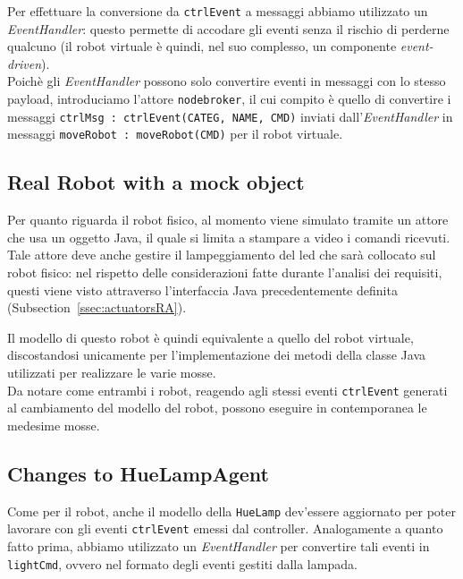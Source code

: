 \documentclass{../llncs}
\newcommand{\codescript}[1]{{\mbox{\small{\texttt{#1}}}}\xspace}
\newcommand{\xss}[1]{\subsectionname~\ref{ssec:#1}}
\newcommand{\subsectionname}{Subsection}
\begin{document}
Per effettuare la conversione da \codescript{ctrlEvent} a messaggi abbiamo utilizzato un \emph{EventHandler}: questo permette di accodare gli eventi senza il rischio di perderne qualcuno (il robot virtuale è quindi, nel suo complesso, un componente \emph{event-driven}).\\



Poichè gli \emph{EventHandler} possono solo convertire eventi in messaggi con lo stesso payload, introduciamo l'attore \texttt{nodebroker}, il cui compito è quello di convertire i messaggi \codescript{ctrlMsg : ctrlEvent(CATEG, NAME, CMD)} inviati dall'\emph{EventHandler} in messaggi \codescript{moveRobot : moveRobot(CMD)} per il robot virtuale.\\



\subsection{Real Robot with a mock object}
Per quanto riguarda il robot fisico, al momento viene simulato tramite un attore che usa un oggetto Java, il quale si limita a stampare a video i comandi ricevuti. Tale attore deve anche gestire il lampeggiamento del led che sarà collocato sul robot fisico: nel rispetto delle considerazioni fatte durante l'analisi dei requisiti, questi viene visto attraverso l'interfaccia Java precedentemente definita (\xss{actuatorsRA}).

Il modello di questo robot è quindi equivalente a quello del robot virtuale, discostandosi unicamente per l'implementazione dei metodi della classe Java utilizzati per realizzare le varie mosse.\\



Da notare come entrambi i robot, reagendo agli stessi eventi \codescript{ctrlEvent} generati al cambiamento del modello del robot, possono eseguire in contemporanea le medesime mosse.

\subsection{Changes to HueLampAgent}
Come per il robot, anche il modello della \texttt{HueLamp} dev'essere aggiornato per poter lavorare con gli eventi \codescript{ctrlEvent} emessi dal controller. Analogamente a quanto fatto prima, abbiamo utilizzato un \emph{EventHandler} per convertire tali eventi in \codescript{lightCmd}, ovvero nel formato degli eventi gestiti dalla lampada.\\
\end{document}
